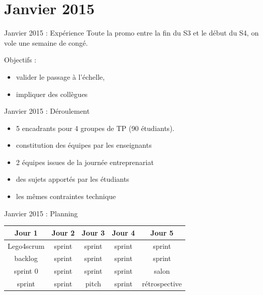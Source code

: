 \documentclass{beamer}
\begin{document}
\section{Janvier 2015}
\begin{frame}{Janvier 2015 : Expérience}
  Toute la promo entre la fin du S3 et le début du S4, on vole une semaine de congé.

  Objectifs : 
  \begin{itemize}
    \item valider le passage à l'échelle, 
    \item impliquer des collègues
  \end{itemize}
\end{frame}

\begin{frame}{Janvier 2015 : Déroulement}
  \begin{itemize}
    \item 5 encadrants pour 4 groupes de TP (90 étudiants).
    \item constitution des équipes par les enseignants
    \item 2 équipes issues de la journée entreprenariat
    \item des sujets apportés par les étudiants
    \item les mêmes contraintes technique
  \end{itemize}
\end{frame}

\begin{frame}{Janvier 2015 : Planning}
  \begin{center}
    \begin{tabular}{| c | c | c | c | c |}
      \hline
      \textbf{Jour 1} & \textbf{Jour 2} & \textbf{Jour 3} & \textbf{Jour 4} & \textbf{Jour 5} \\
      \hline \hline
      Lego4scrum      & sprint          & sprint          & sprint          & sprint          \\
      \hline
      backlog         & sprint          & sprint          & sprint          & sprint          \\
      \hline \hline
      sprint 0        & sprint          & sprint          & sprint          & salon           \\
      \hline
      sprint          & sprint          & pitch           & sprint          & rétrospective   \\
      \hline
    \end{tabular}
  \end{center}
\end{frame}
\end{document}
